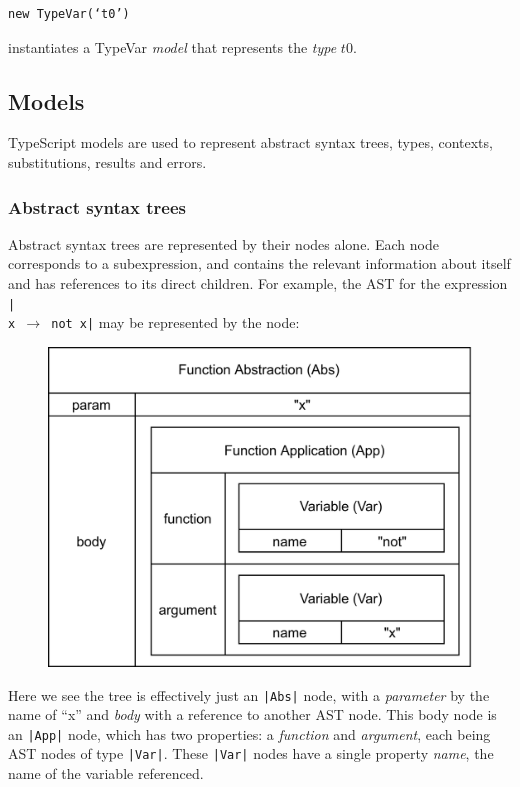 \documentclass[a4paper,fleqn,twoside,12pt]{report}
\begin{document}
\begin{verbatim}
new TypeVar(‘t0’)
\end{verbatim}

instantiates a TypeVar \textit{model} that represents the \textit{type} $t0$.
\subsection{Models}\label{id:h.f0aymht9bwx3}
TypeScript models are used to represent abstract syntax trees, types, contexts, substitutions, results and errors.
\subsubsection{Abstract syntax trees}\label{id:h.26q0jf334v10}
Abstract syntax trees are represented by their nodes alone. Each node corresponds to a subexpression, and contains the relevant information about itself and has references to its direct children. For example, the AST for the expression \texttt{|\\x $\rightarrow$ not x|} may be represented by the node:

{\centering \begin{figure}[h!]
  \centering
  \includegraphics[width=0.863\linewidth]{images/image19.png}
\end{figure} \par}

Here we see the tree is effectively just an \texttt{|Abs|} node, with a \textit{parameter} by the name of “x” and \textit{body} with a reference to another AST node. This body node is an \texttt{|App|} node, which has two properties: a \textit{function} and \textit{argument}, each being AST nodes of type \texttt{|Var|}. These \texttt{|Var|} nodes have a single property \textit{name}, the name of the variable referenced.
\end{document}
